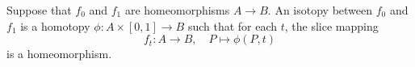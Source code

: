Suppose that $f_0$ and $f_1$ are homeomorphisms $A \to B$. An isotopy between $f_0$ and $f_1$ is a homotopy $\phi: A \times [0, 1] \to B$ such that for each $t$, the slice mapping
$$f_t: A \to B, \quad P \mapsto \phi(P, t)$$
is a homeomorphism.
